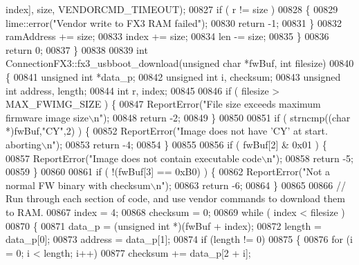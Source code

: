 \begin{DoxyCode}
{{{{      index], size, VENDORCMD\_TIMEOUT);
00827         \textcolor{keywordflow}{if} ( r != size )
00828         \{
00829             lime::error(\textcolor{stringliteral}{"Vendor write to FX3 RAM failed"});
00830             \textcolor{keywordflow}{return} -1;
00831         \}
00832         ramAddress += size;
00833         index      += size;
00834         len        -= size;
00835     \}
00836     \textcolor{keywordflow}{return} 0;
00837 \}
00838 
00839 \textcolor{keywordtype}{int} ConnectionFX3::fx3\_usbboot\_download(\textcolor{keywordtype}{unsigned} \textcolor{keywordtype}{char} *fwBuf, \textcolor{keywordtype}{int} filesize)
00840 \{
00841     \textcolor{keywordtype}{unsigned} \textcolor{keywordtype}{int}  *data\_p;
00842     \textcolor{keywordtype}{unsigned} \textcolor{keywordtype}{int} i, checksum;
00843     \textcolor{keywordtype}{unsigned} \textcolor{keywordtype}{int} address, length;
00844     \textcolor{keywordtype}{int} r, index;
00845 
00846     \textcolor{keywordflow}{if} ( filesize > MAX\_FWIMG\_SIZE ) \{
00847         ReportError(\textcolor{stringliteral}{"File size exceeds maximum firmware image size\(\backslash\)n"});
00848         \textcolor{keywordflow}{return} -2;
00849     \}
00850 
00851     \textcolor{keywordflow}{if} ( strncmp((\textcolor{keywordtype}{char} *)fwBuf,\textcolor{stringliteral}{"CY"},2) ) \{
00852         ReportError(\textcolor{stringliteral}{"Image does not have 'CY' at start. aborting\(\backslash\)n"});
00853         \textcolor{keywordflow}{return} -4;
00854     \}
00855 
00856     \textcolor{keywordflow}{if} ( fwBuf[2] & 0x01 ) \{
00857         ReportError(\textcolor{stringliteral}{"Image does not contain executable code\(\backslash\)n"});
00858         \textcolor{keywordflow}{return} -5;
00859     \}
00860 
00861     \textcolor{keywordflow}{if} ( !(fwBuf[3] == 0xB0) ) \{
00862         ReportError(\textcolor{stringliteral}{"Not a normal FW binary with checksum\(\backslash\)n"});
00863         \textcolor{keywordflow}{return} -6;
00864     \}
00865 
00866     \textcolor{comment}{// Run through each section of code, and use vendor commands to download them to RAM.}
00867     index    = 4;
00868     checksum = 0;
00869     \textcolor{keywordflow}{while} ( index < filesize )
00870     \{
00871         data\_p  = (\textcolor{keywordtype}{unsigned} \textcolor{keywordtype}{int} *)(fwBuf + index);
00872         length  = data\_p[0];
00873         address = data\_p[1];
00874         \textcolor{keywordflow}{if} (length != 0)
00875         \{
00876             \textcolor{keywordflow}{for} (i = 0; i < length; i++)
00877                 checksum += data\_p[2 + i];
}}}}
\end{DoxyCode}
